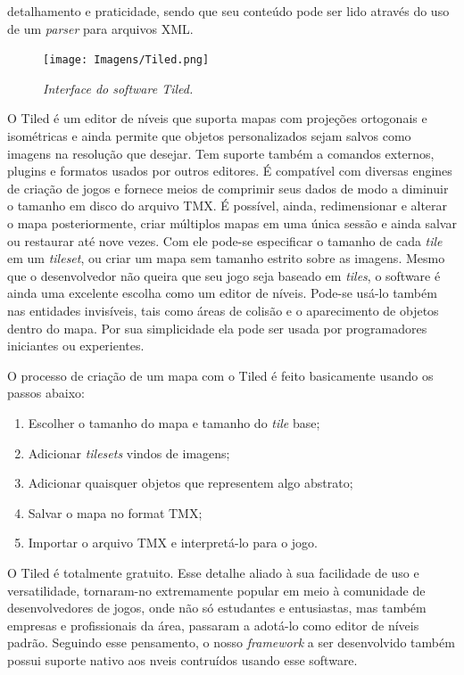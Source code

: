 \documentclass[a4paper,12pt]{report}
\begin{document}
detalhamento e praticidade, sendo que seu conteúdo pode ser lido através do uso de um \textit{parser} para arquivos XML.
%
\begin{figure}[H]
    \centering
    \texttt{[image: Imagens/Tiled.png]}
    \caption{\textit{Interface do \textit{software} Tiled.}}
    \label{tiled_interface}
\end{figure}
%
\par
O Tiled é um editor de níveis que suporta mapas com projeções ortogonais e isométricas e ainda permite que 
objetos personalizados sejam salvos como imagens na resolução que desejar. Tem suporte também a comandos externos, 
plugins e formatos usados por outros editores. É compatível 
com diversas engines de criação de jogos e fornece meios de comprimir seus dados de modo a diminuir o tamanho em disco do arquivo TMX.
É possível, ainda, redimensionar e alterar o mapa posteriormente, criar múltiplos mapas em uma única sessão e ainda salvar ou 
restaurar até nove vezes. Com ele pode-se especificar o tamanho de cada \textit{tile} em um \textit{tileset}, ou criar um mapa sem tamanho estrito 
sobre as imagens.
Mesmo que o desenvolvedor não queira que seu jogo seja baseado em \textit{tiles}, o software é ainda uma excelente escolha como um editor 
de níveis. Pode-se usá-lo também nas entidades invisíveis, tais como áreas de colisão e o aparecimento de objetos dentro do 
mapa. Por sua simplicidade ela pode ser usada por programadores iniciantes ou experientes.
\par 
O processo de criação de um mapa com o Tiled é feito basicamente usando os passos abaixo:
%
\begin{enumerate}
 \item Escolher o tamanho do mapa e tamanho do \textit{tile} base;
 \item Adicionar \textit{tilesets} vindos de imagens;
 \item Adicionar quaisquer objetos que representem algo abstrato;
 \item Salvar o mapa no format TMX;
 \item Importar o arquivo TMX e interpretá-lo para o jogo.
\end{enumerate}
O Tiled é totalmente gratuito. Esse detalhe aliado à sua facilidade de uso e versatilidade, tornaram-no extremamente popular em meio
à comunidade de desenvolvedores de jogos, onde não só estudantes e entusiastas, mas também empresas e profissionais da área, passaram a adotá-lo 
como editor de níveis padrão. Seguindo esse pensamento, o nosso \textit{framework} a ser desenvolvido também possui suporte nativo
aos nveis contruídos usando esse software.
%
\end{document}
